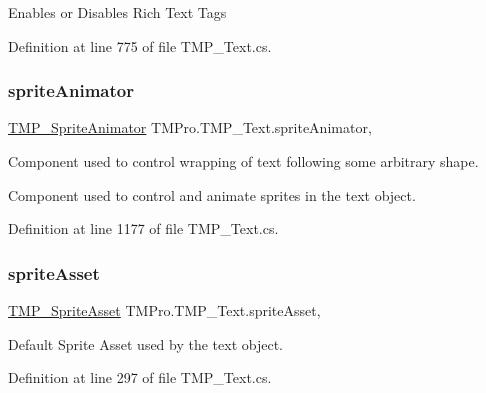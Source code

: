 Enables or Disables Rich Text Tags 



Definition at line 775 of file T\+M\+P\+\_\+\+Text.\+cs.

\mbox{\label{class_t_m_pro_1_1_t_m_p___text_a013a80598d678447ae8104c50d3203cf}} 
\subsubsection{\texorpdfstring{spriteAnimator}{spriteAnimator}}
{\footnotesize\ttfamily \mbox{\hyperlink{class_t_m_pro_1_1_t_m_p___sprite_animator}{T\+M\+P\+\_\+\+Sprite\+Animator}} T\+M\+Pro.\+T\+M\+P\+\_\+\+Text.\+sprite\+Animator\hspace{0.3cm}{\ttfamily [get]}, {\ttfamily [protected]}}



Component used to control wrapping of text following some arbitrary shape. 

Component used to control and animate sprites in the text object. 

Definition at line 1177 of file T\+M\+P\+\_\+\+Text.\+cs.

\mbox{\label{class_t_m_pro_1_1_t_m_p___text_a01e29ceb3a187b51d5d87ec519c8c053}} 
\subsubsection{\texorpdfstring{spriteAsset}{spriteAsset}}
{\footnotesize\ttfamily \mbox{\hyperlink{class_t_m_pro_1_1_t_m_p___sprite_asset}{T\+M\+P\+\_\+\+Sprite\+Asset}} T\+M\+Pro.\+T\+M\+P\+\_\+\+Text.\+sprite\+Asset\hspace{0.3cm}{\ttfamily [get]}, {\ttfamily [set]}}



Default Sprite Asset used by the text object. 



Definition at line 297 of file T\+M\+P\+\_\+\+Text.\+cs.

\mbox{\label{class_t_m_pro_1_1_t_m_p___text_a98a04e5078612c0586472bd510f91f5c}} 
